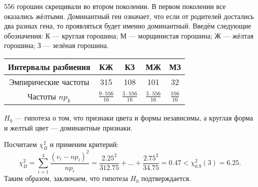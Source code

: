 \begin{ex}[Мендель]
  556 горошин скрещивали во втором поколении.
  В первом поколении все оказались жёлтыми.
  Доминантный ген означает, что если от родителей достались два разных гена,
  то проявляться будет именно доминантный. Введём следующие обозначения: К ---
  круглая горошина; М --- морщинистая горошина; Ж --- жёлтая горошина; З ---
  зелёная горошина.
  
  \begin{center}
    \begin{tabular}{|c|c|c|c|c|}
      \hline
       Интервалы разбиения & КЖ & КЗ & МЖ & МЗ \\
      \hline
      Эмпирические частоты & 315 & 108 & 101 & 32 \\
      \hline
      Частоты $np_k$ & $\frac{9\cdot 556}{16}$ & $\frac{3\cdot 556}{16}$ &
      $\frac{3\cdot 556}{16}$ & \vphantom{\biggl|}$\frac{556}{16}$ \\
      \hline
    \end{tabular}
  \end{center}

  $H_0$ --- гипотеза о том, что признаки цвета и формы независимы, а круглая
  форма и желтый цвет --- доминантные признаки.

  Посчитаем $\chi^2_B$ и применим критерий:
  \[
    \chi^2_B = \sum_{i=1}^4 \frac{(v_i - np_i)^2}{np_i} = \frac{2.25^2}{312.75}
    + \ldots + \frac{2.75^2}{34.75} = 0.47 < \chi^2_{0.9} (3) = 6.25.
  \]
  Таким образом, заключаем, что гипотеза $H_0$ подтверждается.
\end{ex}

